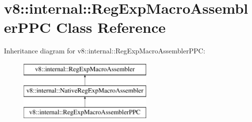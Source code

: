 \hypertarget{classv8_1_1internal_1_1RegExpMacroAssemblerPPC}{}\section{v8\+:\+:internal\+:\+:Reg\+Exp\+Macro\+Assembler\+P\+PC Class Reference}
\label{classv8_1_1internal_1_1RegExpMacroAssemblerPPC}
Inheritance diagram for v8\+:\+:internal\+:\+:Reg\+Exp\+Macro\+Assembler\+P\+PC\+:\begin{figure}[H]
\begin{center}
\leavevmode
\includegraphics[height=3.000000cm]{classv8_1_1internal_1_1RegExpMacroAssemblerPPC}
\end{center}
\end{figure}
